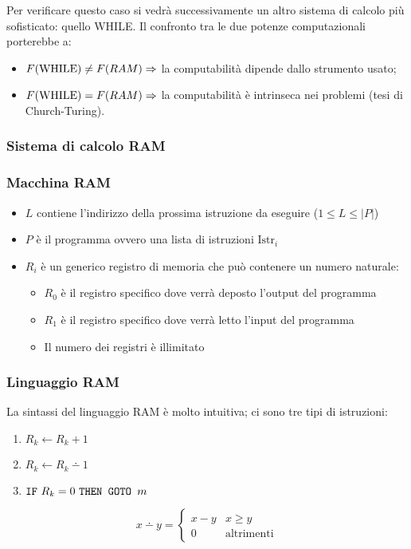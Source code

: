 Per verificare questo caso si vedrà successivamente un altro sistema di calcolo più
sofisticato: quello WHILE. Il confronto tra le due potenze computazionali porterebbe a:
\begin{itemize}
    \item $F(\text{WHILE})\neq F(RAM) \Rightarrow$ la computabilità dipende dallo strumento usato;
    \item $F(\text{WHILE})=F(RAM) \Rightarrow$ la computabilità è intrinseca nei problemi 
        (tesi di Church-Turing).
\end{itemize}

\subsubsection{Sistema di calcolo RAM}
\subsubsection*{Macchina RAM}
\begin{figure}[H]
    \centering
    
\end{figure}
\begin{itemize}
    \item $L$ contiene l'indirizzo della prossima istruzione da eseguire ($1\leq L\leq |P|$)
    \item $P$ è il programma ovvero una lista di istruzioni $\text{Istr}_i$
    \item $R_i$ è un generico registro di memoria che può contenere un numero naturale:
    \begin{itemize}
        \item $R_0$ è il registro specifico dove verrà deposto l'output del programma
        \item $R_1$ è il registro specifico dove verrà letto l'input del programma
        \item Il numero dei registri è illimitato
    \end{itemize}
\end{itemize}
\subsubsection*{Linguaggio RAM}
La sintassi del linguaggio RAM è molto intuitiva; ci sono tre tipi di istruzioni:

\begin{minipage}{.4\textwidth}
    \begin{enumerate}
        \itemsep.5em 
        \item $R_k \leftarrow R_k +1$ 
        \item $R_k \leftarrow R_k \dotminus 1$
        \item $\texttt{IF}\text{ $R_k=0$ }\texttt{THEN GOTO }\text{$m$}$
    \end{enumerate}
\end{minipage}
\begin{minipage}{.49\textwidth}
    $$x\dotminus y =\begin{cases}x-y&x\geq y\\ 0 &\text{altrimenti}\end{cases}$$
\end{minipage}

